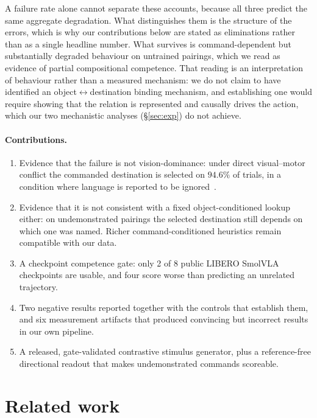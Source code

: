 \documentclass{article}
\begin{document}
A failure rate alone cannot separate these accounts, because all three predict the same
aggregate degradation. What distinguishes them is the structure of the errors, which is why our
contributions below are stated as eliminations rather than as a single headline number. What
survives is command-dependent but substantially degraded behaviour on untrained pairings, which
we read as evidence of partial compositional competence. That reading is an interpretation of
behaviour rather than a measured mechanism: we do not claim to have identified an
object$\leftrightarrow$destination binding mechanism, and establishing one would require showing
that the relation is represented and causally drives the action, which our two mechanistic
analyses (\S\ref{sec:exp}) do not achieve.

\paragraph{Contributions.}
\begin{enumerate}\itemsep0pt
\item Evidence that the failure is not vision-dominance: under direct visual--motor conflict
  the commanded destination is selected on $94.6\%$ of trials, in a condition where language is
  reported to be ignored~\citep{notallfeatures}.
\item Evidence that it is not consistent with a fixed object-conditioned lookup either: on
  undemonstrated pairings the selected destination still depends on which one was named. Richer
  command-conditioned heuristics remain compatible with our data.
\item A checkpoint competence gate: only 2 of 8 public LIBERO SmolVLA checkpoints are usable,
  and four score worse than predicting an unrelated trajectory.
\item Two negative results reported together with the controls that establish them, and six
  measurement artifacts that produced convincing but incorrect results in our own pipeline.
\item A released, gate-validated contrastive stimulus generator, plus a reference-free
  directional readout that makes undemonstrated commands scoreable.
\end{enumerate}

\section{Related work}
\label{sec:related}
\end{document}
